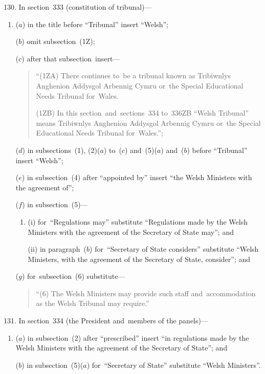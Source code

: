 \documentclass[12pt,a4paper]{article}
\begin{document}
130.  In section~333 (constitution of tribunal)—
\begin{enumerate}\item[]
($a$) in the title before “Tribunal” insert “Welsh”;

($b$) omit subsection~(1Z);

($c$) after that subsection~insert—

\begin{quotation}
“(1ZA) There continues to~be a tribunal known as {Tribiwnlys Anghenion Addysgol Arbennig Cymru} or~the Special Educational Needs Tribunal for~Wales.

(1ZB) In this section~and~sections~334 to~336ZB “Welsh Tribunal” means {Tribiwnlys Anghenion Addysgol Arbennig Cymru} or~the Special Educational Needs Tribunal for~Wales.”;
\end{quotation}

($d$) in subsections~(1), (2)($a$)  to~($c$)  and~(5)($a$)  and~($b$)  before “Tribunal” insert “Welsh”;

($e$) in subsection~(4) after “appointed by” insert “the Welsh Ministers with the agreement of”;

($f$) in subsection~(5)—
\begin{enumerate}\item[]
(i) for~“Regulations may” substitute “Regulations made by the Welsh Ministers with the agreement of the Secretary of State may”; and

(ii) in paragraph~($b$)  for~“Secretary of State considers” substitute “Welsh Ministers, with the agreement of the Secretary of State, consider”; and
\end{enumerate}

($g$) for~subsection~(6) substitute—
\begin{quotation}
“(6) The Welsh Ministers may provide such staff and~accommodation as the Welsh Tribunal may require.”
\end{quotation}
\end{enumerate}

\medskip

131.  In section~334 (the President and~members of the panels)—
\begin{enumerate}\item[]
($a$) in subsection~(2) after “prescribed” insert “in regulations made by the Welsh Ministers with the agreement of the Secretary of State”; and

($b$) in subsection~(5)($a$)  for~“Secretary of State” substitute “Welsh Ministers”.
\end{enumerate}
\end{document}
